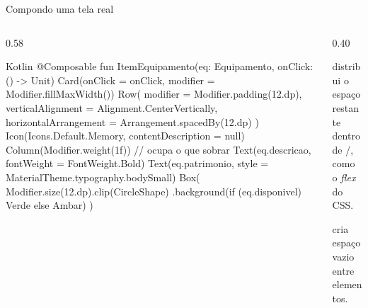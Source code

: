 \documentclass[aspectratio=169,10pt]{beamer}
\begin{document}
\begin{frame}[fragile]{Compondo uma tela real}
  \begin{columns}[T]
    \begin{column}{0.58\textwidth}
\begin{codigo}[title=ItemEquipamento.kt]{Kotlin}
@Composable
fun ItemEquipamento(eq: Equipamento, onClick: () -> Unit) {
  Card(onClick = onClick, modifier = Modifier.fillMaxWidth()) {
    Row(
      modifier = Modifier.padding(12.dp),
      verticalAlignment = Alignment.CenterVertically,
      horizontalArrangement = Arrangement.spacedBy(12.dp)
    ) {
      Icon(Icons.Default.Memory, contentDescription = null)
      Column(Modifier.weight(1f)) {   // ocupa o que sobrar
        Text(eq.descricao, fontWeight = FontWeight.Bold)
        Text(eq.patrimonio,
          style = MaterialTheme.typography.bodySmall)
      }
      Box(
        Modifier.size(12.dp).clip(CircleShape)
          .background(if (eq.disponivel) Verde else Ambar)
      )
    }
  }
}
\end{codigo}
    \end{column}
    \begin{column}{0.40\textwidth}
      \centering
      \begin{dica}
         distribui o espaço restante dentro de /, como o \emph{flex} do CSS.
      \end{dica}
      \begin{dica}
         cria espaço vazio entre elementos.
      \end{dica}
    \end{column}
  \end{columns}
\end{frame}
\end{document}
